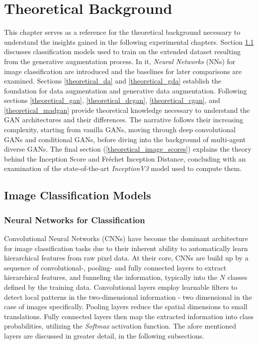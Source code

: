 \section{Theoretical Background}\label{body_theoretical_background}
This chapter serves as a reference for the theoretical background necessary to understand the insights gained in the following experimental chapters.
Section \ref{theoretical_classification} discusses classification models used to train on the extended dataset resulting from the generative augmentation process. In it, \textit{Neural Networks} (NNs) for image classification are introduced and the baselines for later comparisons are examined.
Sections \ref{theoretical_da} and \ref{theoretical_gda} establish the foundation for data augmentation and generative data augmentation.
Following sections \ref{theoretical_gan}, \ref{theoretical_dcgan}, \ref{theoretical_cgan}, and \ref{theoretical_madgan} provide theoretical knowledge necessary to understand the GAN architectures and their differences. The narrative follows their increasing complexity, starting from vanilla GANs, moving through deep convolutional GANs and conditional GANs, before diving into the background of multi-agent diverse GANs.
The final section (\ref{theoretical_image_scores}) explains the theory behind the Inception Score and Fréchet Inception Distance, concluding with an examination of the state-of-the-art \textit{InceptionV3} model used to compute them.

\subsection{Image Classification Models}\label{theoretical_classification}
\subsubsection{Neural Networks for Classification}
Convolutional Neural Networks (CNNs) have become the dominant architecture for image classification tasks due to their inherent ability to automatically learn hierarchical features from raw pixel data. At their core, CNNs are build up by a sequence of convolutional-, pooling- and fully connected layers to extract hierarchical features, and funneling the information, typically into the \(N\) classes defined by the training data. Convolutional layers employ learnable filters to detect local patterns in the two-dimensional information - two dimensional in the case of images specifically. Pooling layers reduce the spatial dimensions to small translations. Fully connected layers then map the extracted information into class probabilities, utilizing the \textit{Softmax} activation function. The afore mentioned layers are discussed in greater detail, in the following subsections.

